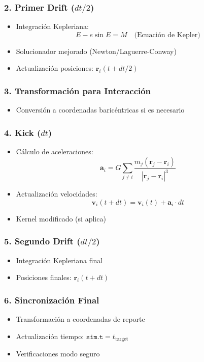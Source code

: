 \subsubsection*{2. Primer Drift ($dt/2$)}
\begin{itemize}
    \item Integración Kepleriana:
    \[
    E - e\sin E = M \quad \text{(Ecuación de Kepler)}
    \]
    \item Solucionador mejorado (Newton/Laguerre-Conway)
    \item Actualización posiciones: $\mathbf{r}_i(t + dt/2)$
\end{itemize}

\subsubsection*{3. Transformación para Interacción}
\begin{itemize}
    \item Conversión a coordenadas baricéntricas si es necesario
\end{itemize}

\subsubsection*{4. Kick ($dt$)}
\begin{itemize}
    \item Cálculo de aceleraciones:
    \[
    \mathbf{a}_i = G\sum_{j\neq i}\frac{m_j(\mathbf{r}_j - \mathbf{r}_i)}{|\mathbf{r}_j - \mathbf{r}_i|^3}
    \]
    \item Actualización velocidades:
    \[
    \mathbf{v}_i(t + dt) = \mathbf{v}_i(t) + \mathbf{a}_i \cdot dt
    \]
    \item Kernel modificado (si aplica)
\end{itemize}

\subsubsection*{5. Segundo Drift ($dt/2$)}
\begin{itemize}
    \item Integración Kepleriana final
    \item Posiciones finales: $\mathbf{r}_i(t + dt)$
\end{itemize}

\subsubsection*{6. Sincronización Final}
\begin{itemize}
    \item Transformación a coordenadas de reporte
    \item Actualización tiempo: $\texttt{sim.t} = t_{\text{target}}$
    \item Verificaciones modo seguro
\end{itemize}

